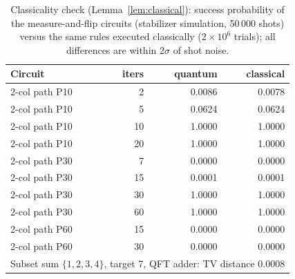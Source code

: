 \begin{table}[t]\centering\small
\caption{Classicality check (Lemma~\ref{lem:classical}): success probability of the measure-and-flip circuits (stabilizer simulation, 50\,000 shots) versus the same rules executed classically ($2\times10^6$ trials); all differences are within $2\sigma$ of shot noise.}\label{tab:classical}
\begin{tabular}{lrrr}\toprule Circuit & iters & quantum & classical\\\midrule
2-col path P10 & 2 & 0.0086 & 0.0078\\
2-col path P10 & 5 & 0.0624 & 0.0624\\
2-col path P10 & 10 & 1.0000 & 1.0000\\
2-col path P10 & 20 & 1.0000 & 1.0000\\
2-col path P30 & 7 & 0.0000 & 0.0000\\
2-col path P30 & 15 & 0.0001 & 0.0001\\
2-col path P30 & 30 & 1.0000 & 1.0000\\
2-col path P30 & 60 & 1.0000 & 1.0000\\
2-col path P60 & 15 & 0.0000 & 0.0000\\
2-col path P60 & 30 & 0.0000 & 0.0000\\
\midrule \multicolumn{4}{l}{Subset sum $\{1,2,3,4\}$, target 7, QFT adder: TV distance 0.0008}\\
\bottomrule\end{tabular}
\end{table}